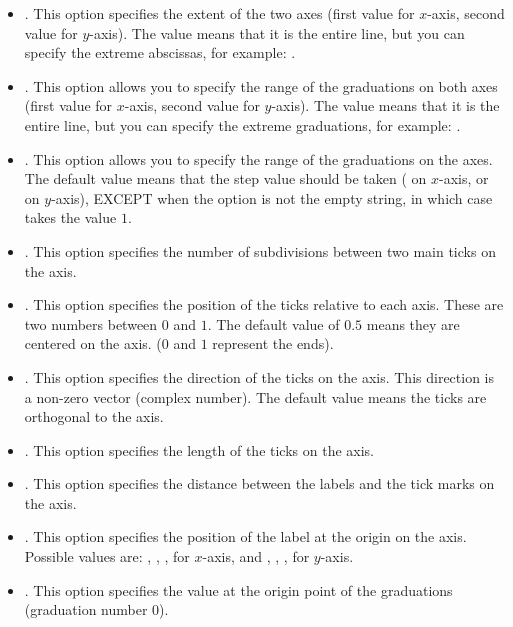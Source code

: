 \begin{itemize}
\begin{itemize}
        \item {}. This option specifies the extent of the two axes (first value for $x$-axis, second value for $y$-axis). The value  means that it is the entire line, but you can specify the extreme abscissas, for example: .
        \item {}. This option allows you to specify the range of the graduations on both axes (first value for $x$-axis, second value for $y$-axis). The value  means that it is the entire line, but you can specify the extreme graduations, for example: .
        \item {}. This option allows you to specify the range of the graduations on the axes. The default value means that the step value should be taken ( on $x$-axis, or  on $y$-axis), EXCEPT when the option  is not the empty string, in which case  takes the value $1$.
        \item {}. This option specifies the number of subdivisions between two main ticks on the axis.
        \item {}. This option specifies the position of the ticks relative to each axis. These are two numbers between $0$ and $1$. The default value of $0.5$ means they are centered on the axis. ($0$ and $1$ represent the ends).
        \item {}. This option specifies the direction of the ticks on the axis. This direction is a non-zero vector (complex number). The default value  means the ticks are orthogonal to the axis.
        \item {}. This option specifies the length of the ticks on the axis.
        \item {}. This option specifies the distance between the labels and the tick marks on the axis.
        \item {}. This option specifies the position of the label at the origin on the axis. Possible values ​​are:  , , ,  for $x$-axis, and , , ,  for $y$-axis.
        
        \item {}. This option specifies the value at the origin point of the graduations (graduation number $0$).
    

\end{itemize}
\end{itemize}

